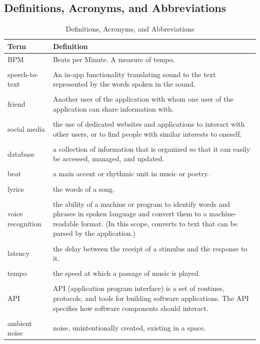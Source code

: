 \documentclass[]{article}
\begin{document}
\subsection{Definitions, Acronyms, and Abbreviations}
\label{sub:definitions_acronyms_and_abbreviations}
\begin{table}[!ht]
\begin{tabularx}{\linewidth}{l|X}
\textbf{Term} & \textbf{Definition} \\
\hline
BPM & Beats per Minute. A measure of tempo.\\\\

speech-to-text & An in-app functionality translating sound to the text represented by the words spoken in the sound.\\\\

friend & Another user of the application with whom one user of the application can share information with.\\\\

social media & the use of dedicated websites and applications to interact with other users, or to find people with similar interests to oneself.\\\\

database & a collection of information that is organized so that it can easily be accessed, managed, and updated.\\\\

beat & a main accent or rhythmic unit in music or poetry.\\\\

lyrics & the words of a song.\\\\

voice recognition & the ability of a machine or program to identify words and phrases in spoken language and convert them to a machine-readable format. (In this scope, converts to text that can be parsed by the application.)\\\\

latency & the delay between the receipt of a stimulus and the response to it.\\\\

tempo & the speed at which a passage of music is played.\\\\

API & API (application program interface) is a set of routines, protocols, and tools for building software applications. The API specifies how software components should interact.\\\\

ambient noise & noise, unintentionally created, existing in a space.
\end{tabularx}
\caption{Definitions, Acronyms, and Abbreviations}
\end{table}
\end{document}
